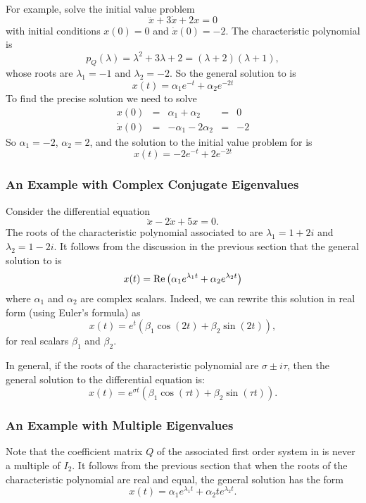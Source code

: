 \documentclass{ximera}
\begin{document}
For example, solve the initial value problem
\begin{equation} \label{e:ex12}
\ddot{x} + 3\dot{x} + 2x = 0
\end{equation}
with initial conditions $x(0)=0$ and $\dot{x}(0)=-2$.  The characteristic
polynomial is
\[
p_Q(\lambda) = \lambda^2 + 3\lambda + 2 = (\lambda+2)(\lambda+1),
\]
whose roots are $\lambda_1=-1$ and $\lambda_2=-2$.  So the general solution
to  is
\[
x(t) = \alpha_1e^{-t} + \alpha_2e^{-2t}
\]
To find the precise solution we need to solve
\[
\begin{array}{rclcl}
x(0) & = & \alpha_1 + \alpha_2 & = & 0 \\
\dot{x}(0) & = & -\alpha_1 - 2\alpha_2 & = & -2
\end{array}
\]
So $\alpha_1 = -2$, $\alpha_2=2$, and the solution to the initial value problem
for  is
\[
x(t) = -2e^{-t} + 2e^{-2t}
\]

\subsubsection*{An Example with Complex Conjugate Eigenvalues}

Consider the differential equation
\begin{equation} \label{E:ex13}
\ddot{x} -2\dot{x} + 5x = 0.
\end{equation}
The roots of the characteristic polynomial associated to  are
$\lambda_1=1+2i$ and $\lambda_2=1-2i$.  It follows from the discussion in
the previous section that the general solution to  is
\[
x(t) = {\rm Re}\left(\alpha_1 e^{\lambda_1 t} + \alpha_2 e^{\lambda_2t}\right)
\]
where $\alpha_1$ and $\alpha_2$ are complex scalars.  Indeed, we can rewrite
this solution in real form (using Euler's formula) as
\[
x(t) = e^t\left(\beta_1\cos(2t) + \beta_2\sin(2t)\right),
\]
for real scalars $\beta_1$ and $\beta_2$.

In general, if the roots of the characteristic polynomial are
$\sigma\pm i\tau$, then the general solution to the differential equation is:
\[
x(t) = e^{\sigma t}\left(\beta_1\cos(\tau t) + \beta_2\sin(\tau t)\right).
\]

\subsubsection*{An Example with Multiple Eigenvalues}

Note that the coefficient matrix $Q$ of the associated first order system
in  is never a multiple of $I_2$.  It follows from the
previous section
that when the roots of the characteristic polynomial are real and equal,
the general solution has the form
\[
x(t) = \alpha_1 e^{\lambda_1t} + \alpha_2te^{\lambda_2t}.
\]
\end{document}
